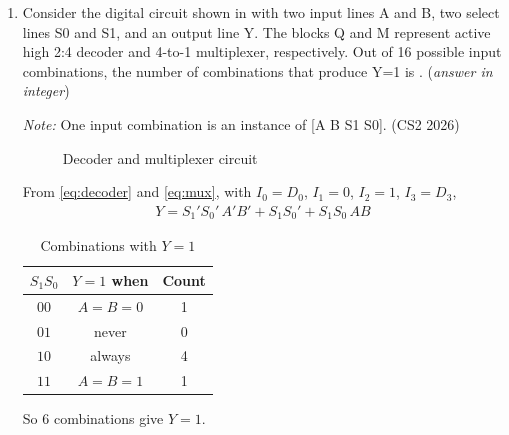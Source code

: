 \begin{enumerate}[label=\thesubsection.\arabic*, ref=\thesubsection.\theenumi]
The following code explores every interleaving and lists all possible outputs.
\begin{lstlisting}
codes/semaphore.py
\end{lstlisting}

\item Consider the digital circuit shown in  with two
input lines A and B, two select lines S0 and S1, and an output line Y. The
blocks Q and M represent active high 2:4 decoder and 4-to-1 multiplexer,
respectively. Out of 16 possible input combinations, the number of
combinations that produce Y=1 is \underline{\hspace{1.5cm}}.
(\textit{answer in integer})

\textit{Note:} One input combination is an instance of [A B S1 S0].
\hfill (CS2 2026)
\begin{figure}[H]
\centering
{}
\caption{Decoder and multiplexer circuit}
\label{fig:q59-ckt}
\end{figure}
\solution From \eqref{eq:decoder} and \eqref{eq:mux}, with $I_0 = D_0$,
$I_1 = 0$, $I_2 = 1$, $I_3 = D_3$,
\begin{align}
Y = S_1'S_0'\,A'B' + S_1 S_0' + S_1 S_0\,AB
\end{align}
\begin{table}[H]
\centering
\begin{tabular}{|c|c|c|}
\hline
$S_1 S_0$ & $Y = 1$ when & \textbf{Count} \\
\hline
$00$ & $A = B = 0$ & 1 \\
$01$ & never & 0 \\
$10$ & always & 4 \\
$11$ & $A = B = 1$ & 1 \\
\hline
\end{tabular}
\caption{Combinations with $Y = 1$}
\end{table}
So $6$ combinations give $Y = 1$.


\end{enumerate}
